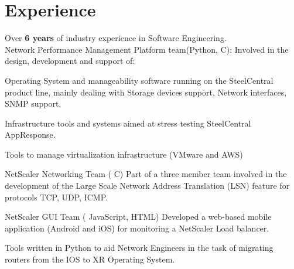 \documentclass[]{deedy-resume-openfont}
\begin{document}
\hfill
\begin{minipage}[t]{0.63\textwidth} 


\section{Experience}
Over \textbf{6 years} of industry experience in Software Engineering.         \\
Network Performance Management Platform team(Python, C):
Involved in the design, development and support of:
\vspace{\topsep}
\begin{tightemize}
\item Operating System and manageability software running on the SteelCentral product line,
 mainly dealing with Storage devices support, Network interfaces, SNMP support.
\item Infrastructure tools and systems aimed at stress testing SteelCentral AppResponse. 
\item Tools to manage virtualization infrastructure (VMware and AWS) 
\end{tightemize}
\sectionsep

\begin{tightemize}
\item NetScaler
Networking
Team
(
C)
Part of a three member team
involved
in
the
development
of
the
Large
Scale
Network
Address
Translation
(LSN)
feature
for
protocols
TCP,
UDP,
ICMP.
\item NetScaler
GUI
Team
(
JavaScript,
HTML)
Developed a
web-based
mobile
application (Android
and
iOS)
for
monitoring
a
NetScaler
Load
balancer.
\end{tightemize}
\sectionsep

Tools written in Python to aid Network Engineers in the task of migrating routers from the IOS to XR Operating System.
\sectionsep



\end{minipage}
\end{document}
